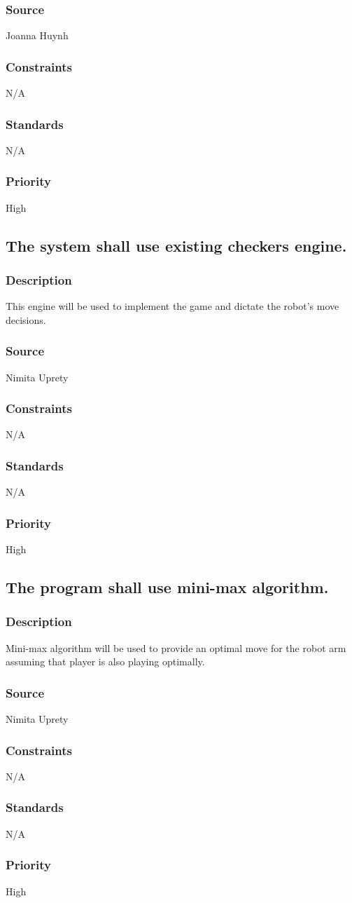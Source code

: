 \subsubsection{Source}
Joanna Huynh
\subsubsection{Constraints}
N/A
\subsubsection{Standards}
N/A
\subsubsection{Priority}
High

\subsection{The system shall use existing checkers engine.}
\subsubsection{Description}
This engine will be used to implement the game and dictate the robot's move decisions.
\subsubsection{Source}
Nimita Uprety
\subsubsection{Constraints}
N/A
\subsubsection{Standards}
N/A
\subsubsection{Priority}
High

\subsection{The program shall use mini-max algorithm.}
\subsubsection{Description}
Mini-max algorithm will be used to provide an optimal move for the robot arm assuming that player is also playing optimally.
\subsubsection{Source}
Nimita Uprety
\subsubsection{Constraints}
N/A
\subsubsection{Standards}
N/A
\subsubsection{Priority}
High